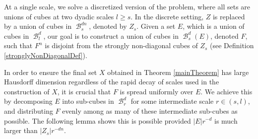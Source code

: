 \documentclass[dvipsnames,letterpaper,12pt]{article}
\numberwithin{equation}{section}
\theoremstyle{plain}
\DeclareMathOperator{\B}{\mathcal{B}}
\begin{document}
At a single scale, we solve a discretized version of the problem, where all sets are unions of cubes at two dyadic scales $l \geq s$. In the discrete setting, $Z$ is replaced by a union of cubes in $\B^{dn}_s$, denoted by $Z_s$. Given a set $E$, which is a union of cubes in $\B_l^d$, our goal is to construct a union of cubes in $\B_s^d(E)$, denoted $F$, such that $F^n$ is disjoint from the strongly non-diagonal cubes of $Z_s$ (see Definition \ref{stronglyNonDiagonalDef}).

In order to ensure the final set $X$ obtained in Theorem \ref{mainTheorem} has large Hausdorff dimension regardless of the rapid decay of scales used in the construction of $X$, it is crucial that $F$ is spread uniformly over $E$. We achieve this by decomposing $E$ into sub-cubes in $\B_r^d$ for some intermediate scale $r \in (s,l)$, and distributing $F$ evenly among as many of these intermediate sub-cubes as possible. The following lemma shows this is possible provided $|E| r^{-d}$ is much larger than $|Z_s|r^{-dn}$.

\end{document}
